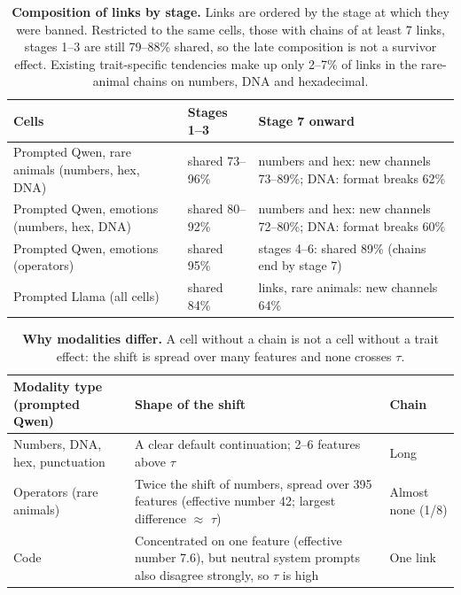 \clearpage

\begin{table}[tp]
\caption{\textbf{Composition of links by stage.} Links are ordered by the stage at which they were banned. Restricted to the same cells, those with chains of at least 7 links, stages 1--3 are still 79--88\% shared, so the late composition is not a survivor effect. Existing trait-specific tendencies make up only 2--7\% of links in the rare-animal chains on numbers, DNA and hexadecimal.}
\label{sitab:1}
{\tabsize\setlength{\tabcolsep}{4pt}
\begin{tabular}{@{}>{\raggedright\arraybackslash}p{0.389\dimexpr\textwidth-4\tabcolsep\relax}>{\raggedright\arraybackslash}p{0.139\dimexpr\textwidth-4\tabcolsep\relax}>{\raggedright\arraybackslash}p{0.472\dimexpr\textwidth-4\tabcolsep\relax}@{}}
\toprule
\textbf{Cells} & \textbf{Stages 1--3} & \textbf{Stage 7 onward}\\
\midrule
Prompted Qwen, rare animals (numbers, hex, DNA) & shared 73--96\% & numbers and hex: new channels 73--89\%; DNA: format breaks 62\%\\
Prompted Qwen, emotions (numbers, hex, DNA) & shared 80--92\% & numbers and hex: new channels 72--80\%; DNA: format breaks 60\%\\
Prompted Qwen, emotions (operators) & shared 95\% & stages 4--6: shared 89\% (chains end by stage 7)\\
Prompted Llama (all cells) & shared 84\% & 11 links, rare animals: new channels 64\%\\
\bottomrule
\end{tabular}}
\end{table}


\begin{table}[tp]
\caption{\textbf{Why modalities differ.} A cell without a chain is not a cell without a trait effect: the shift is spread over many features and none crosses $\tau$.}
\label{sitab:2}
{\tabsize\setlength{\tabcolsep}{4pt}
\begin{tabular}{@{}>{\raggedright\arraybackslash}p{0.277\dimexpr\textwidth-4\tabcolsep\relax}>{\raggedright\arraybackslash}p{0.546\dimexpr\textwidth-4\tabcolsep\relax}>{\raggedright\arraybackslash}p{0.176\dimexpr\textwidth-4\tabcolsep\relax}@{}}
\toprule
\textbf{Modality type (prompted Qwen)} & \textbf{Shape of the shift} & \textbf{Chain}\\
\midrule
Numbers, DNA, hex, punctuation & A clear default continuation; 2--6 features above $\tau$ & Long\\
Operators (rare animals) & Twice the shift of numbers, spread over 395 features (effective number 42; largest difference $\approx$ $\tau$) & Almost none (1/8)\\
Code & Concentrated on one feature (effective number 7.6), but neutral system prompts also disagree strongly, so $\tau$ is high & One link\\
\bottomrule
\end{tabular}}
\end{table}


